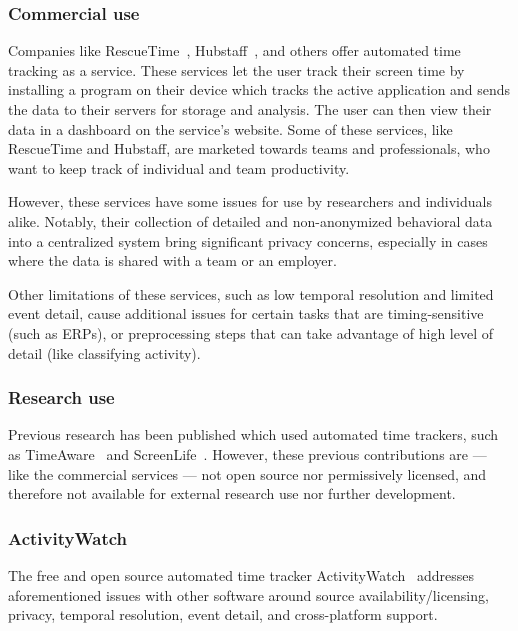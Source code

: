     \subsubsection{Commercial use}

        Companies like RescueTime~\cite{noauthor_rescuetime_nodate}, Hubstaff~\cite{noauthor_hubstaff_nodate}, and others offer automated time tracking as a service. These services let the user track their screen time by installing a program on their device which tracks the active application and sends the data to their servers for storage and analysis. The user can then view their data in a dashboard on the service's website. Some of these services, like RescueTime and Hubstaff, are marketed towards teams and professionals, who want to keep track of individual and team productivity.

        However, these services have some issues for use by researchers and individuals alike. Notably, their collection of detailed and non-anonymized behavioral data into a centralized system bring significant privacy concerns, especially in cases where the data is shared with a team or an employer.

        Other limitations of these services, such as low temporal resolution and limited event detail, cause additional issues for certain tasks that are timing-sensitive (such as ERPs), or preprocessing steps that can take advantage of high level of detail (like classifying activity).

    \subsubsection{Research use}

        Previous research has been published which used automated time trackers, such as TimeAware~\cite{kim_timeaware_2016} and ScreenLife~\cite{rooksby_personal_2016}. However, these previous contributions are --- like the commercial services --- not open source nor permissively licensed, and therefore not available for external research use nor further development.

    \subsubsection{ActivityWatch}

        The free and open source automated time tracker ActivityWatch~\cite{bjareholt_activitywatch_2020} addresses aforementioned issues with other software around source availability/licensing, privacy, temporal resolution, event detail, and cross-platform support.

